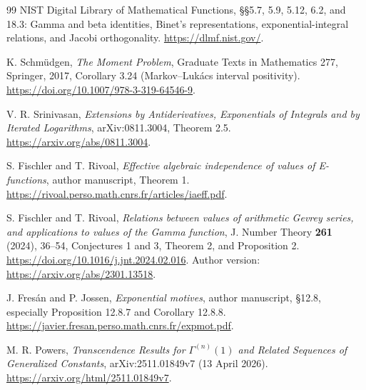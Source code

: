 \documentclass[11pt,a4paper]{article}
\theoremstyle{definition}
\theoremstyle{remark}
\numberwithin{equation}{section}
\begin{document}
\begin{thebibliography}{99}
NIST Digital Library of Mathematical Functions,
\S\S5.7, 5.9, 5.12, 6.2, and 18.3:
Gamma and beta identities, Binet's representations,
exponential-integral relations, and Jacobi orthogonality.
\url{https://dlmf.nist.gov/}.

K. Schm\"udgen,
\emph{The Moment Problem},
Graduate Texts in Mathematics 277, Springer, 2017,
Corollary 3.24 (Markov--Luk\'acs interval positivity).
\url{https://doi.org/10.1007/978-3-319-64546-9}.

V. R. Srinivasan,
\emph{Extensions by Antiderivatives, Exponentials of Integrals and
by Iterated Logarithms},
arXiv:0811.3004, Theorem 2.5.
\url{https://arxiv.org/abs/0811.3004}.

S. Fischler and T. Rivoal,
\emph{Effective algebraic independence of values of E-functions},
author manuscript, Theorem 1.
\url{https://rivoal.perso.math.cnrs.fr/articles/iaeff.pdf}.

S. Fischler and T. Rivoal,
\emph{Relations between values of arithmetic Gevrey series, and
applications to values of the Gamma function},
J. Number Theory \textbf{261} (2024), 36--54,
Conjectures 1 and 3, Theorem 2, and Proposition 2.
\url{https://doi.org/10.1016/j.jnt.2024.02.016}.
Author version: \url{https://arxiv.org/abs/2301.13518}.

J. Fres\'an and P. Jossen,
\emph{Exponential motives}, author manuscript,
\S12.8, especially Proposition 12.8.7 and Corollary 12.8.8.
\url{https://javier.fresan.perso.math.cnrs.fr/expmot.pdf}.

M. R. Powers,
\emph{Transcendence Results for $\Gamma^{(n)}(1)$ and Related Sequences
of Generalized Constants},
arXiv:2511.01849v7 (13 April 2026).
\url{https://arxiv.org/html/2511.01849v7}.

\end{thebibliography}
\end{document}

